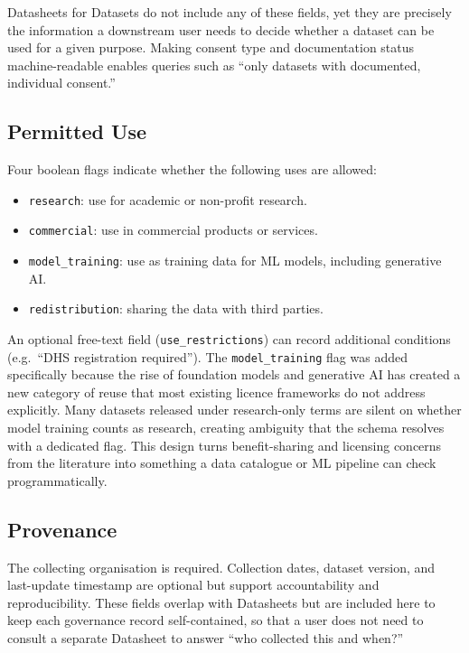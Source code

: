 \documentclass{article}
\begin{document}
Datasheets for Datasets do not include any of these fields, yet they are precisely the information a downstream user needs to decide whether a dataset can be used for a given purpose. Making consent type and documentation status machine-readable enables queries such as ``only datasets with documented, individual consent.''

\subsection{Permitted Use}

Four boolean flags indicate whether the following uses are allowed:

\begin{itemize}
    \item \texttt{research}: use for academic or non-profit research.
    \item \texttt{commercial}: use in commercial products or services.
    \item \texttt{model\_training}: use as training data for ML models, including generative AI.
    \item \texttt{redistribution}: sharing the data with third parties.
\end{itemize}

An optional free-text field (\texttt{use\_restrictions}) can record additional conditions (e.g.\ ``DHS registration required''). The \texttt{model\_training} flag was added specifically because the rise of foundation models and generative AI has created a new category of reuse that most existing licence frameworks do not address explicitly. Many datasets released under research-only terms are silent on whether model training counts as research, creating ambiguity that the schema resolves with a dedicated flag. This design turns benefit-sharing and licensing concerns from the literature \cite{munung2025,chabilall2024} into something a data catalogue or ML pipeline can check programmatically.

\subsection{Provenance}

The collecting organisation is required. Collection dates, dataset version, and last-update timestamp are optional but support accountability and reproducibility. These fields overlap with Datasheets but are included here to keep each governance record self-contained, so that a user does not need to consult a separate Datasheet to answer ``who collected this and when?''
\end{document}
